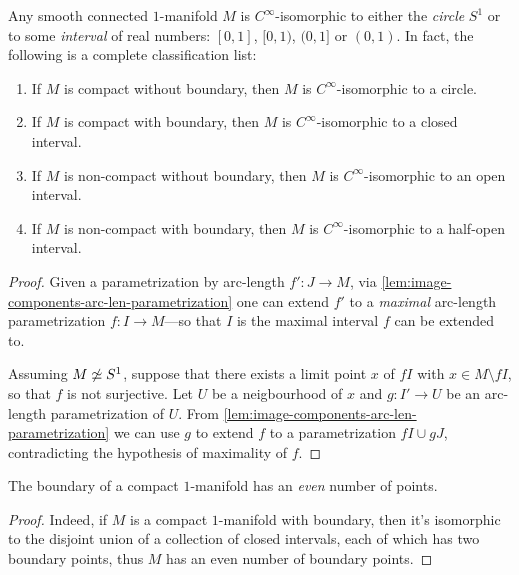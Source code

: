 \begin{theorem}
    \label{thm:classification-of-1-manifolds}
    Any smooth connected \(1\)-manifold \(M\) is \(C^{\infty}\)-isomorphic to either
    the \emph{circle} \(S^1\) or to some \emph{interval} of real numbers:
    \([0, 1]\), \([0, 1)\), \((0, 1]\) or \((0, 1)\). In fact, the following is a
    complete classification list:
    \begin{enumerate}[(1)]\setlength\itemsep{0em}
        \item If \(M\) is compact without boundary, then \(M\) is
              \(C^{\infty}\)-isomorphic to a circle.

        \item If \(M\) is compact with boundary, then \(M\) is \(C^{\infty}\)-isomorphic
              to a closed interval.

        \item If \(M\) is non-compact without boundary, then \(M\) is
              \(C^{\infty}\)-isomorphic to an open interval.

        \item If \(M\) is non-compact with boundary, then \(M\) is
              \(C^{\infty}\)-isomorphic to a half-open interval.
    \end{enumerate}
\end{theorem}

\begin{proof}
    Given a parametrization by arc-length \(f': J \to M\), via
    \cref{lem:image-components-arc-len-parametrization} one can extend \(f'\) to a
    \emph{maximal} arc-length parametrization \(f: I \to M\)---so that \(I\) is the
    maximal interval \(f\) can be extended to.

    Assuming \(M \not\simeq S^{1}\), suppose that there exists a limit point \(x\) of
    \(f I\) with \(x \in M \setminus f I\), so that \(f\) is not surjective. Let
    \(U\) be a neigbourhood of \(x\) and \(g: I' \to U\) be an arc-length
    parametrization of \(U\). From
    \cref{lem:image-components-arc-len-parametrization} we can use \(g\) to extend
    \(f\) to a parametrization \(f I \cup g J\), contradicting the hypothesis of
    maximality of \(f\).
\end{proof}

\begin{corollary}
    \label{cor:1-manifold-boundary-even-number-of-points}
    The boundary of a compact \(1\)-manifold has an \emph{even} number of points.
\end{corollary}

\begin{proof}
    Indeed, if \(M\) is a compact \(1\)-manifold with boundary, then it's
    isomorphic to the disjoint union of a collection of closed intervals, each of
    which has two boundary points, thus \(M\) has an even number of boundary points.
\end{proof}

